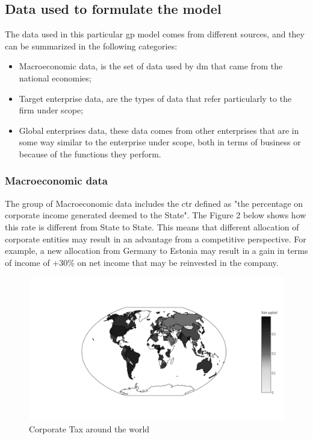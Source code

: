 \begin{doublespace}
\subsection{Data used to formulate the model}
The data used in this particular \gls{gp} model comes from different sources, and they can be summarized in the following categories:
\begin{itemize}
	\item Macroeconomic data, is the set of data used by \gls{dm} that came from the national economies;
    \item Target enterprise data, are the types of data that refer particularly to the firm under scope;
    \item Global enterprises data, these data comes from other enterprises that are in some way similar to the enterprise under scope, both in terms of business or because of the functions they perform.
\end{itemize}

\subsubsection{Macroeconomic data}
The group of Macroeconomic data includes the \gls{ctr} defined as "the percentage on corporate income generated deemed to the State". The Figure 2 below shows how this rate is different from State to State. This means that different allocation of corporate entities may result in an advantage from a competitive perspective. For example, a new allocation from Germany to Estonia may result in a gain in terms of income of +30\% on net income that may be reinvested in the company.
\begin{figure}
\centering
  \centering
  \includegraphics[width=1\linewidth]{Images/CTworld.png}
  \caption{Corporate Tax around the world}
\label{fig:test1}
\end{figure}


\end{doublespace}
